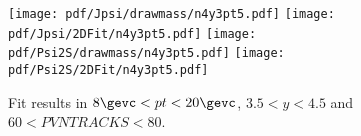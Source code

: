 \begin{figure}[H]
\begin{center}
\texttt{[image: pdf/Jpsi/drawmass/n4y3pt5.pdf]}
\texttt{[image: pdf/Jpsi/2DFit/n4y3pt5.pdf]}
\vspace*{-0.5cm}
\texttt{[image: pdf/Psi2S/drawmass/n4y3pt5.pdf]}
\texttt{[image: pdf/Psi2S/2DFit/n4y3pt5.pdf]}
\vspace*{-0.5cm}
\end{center}
\caption{Fit results in $8\gevc<pt<20\gevc$, $3.5<y<4.5$ and $60<PVNTRACKS<80$.}
\label{Fitn4y3pt5}
\end{figure}
